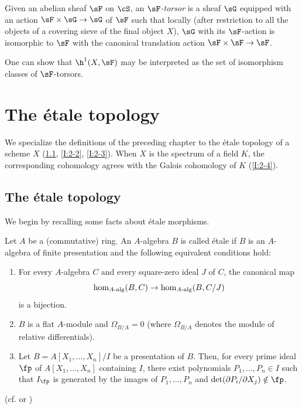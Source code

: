 \documentclass[oneside]{book}
\begin{document}
\subsubsection{}\label{I:1-6-6}

Given an abelian sheaf $\sF$ on $\cS$, an \emph{$\sF$-torsor} is a
sheaf $\sG$ equipped with an action $\sF\times\sG\to\sG$ of $\sF$
such that locally (after restriction to all the objects of a covering
sieve of the final object $X$), $\sG$ with its $\sF$-action is
isomorphic to $\sF$ with the canonical translation action
$\sF\times\sF\to\sF$.

One can show that $\h^1(X,\sF)$ may be interpreted as the set of
isomorphism classes of $\sF$-torsors.

\section{The étale topology}\label{I:2}

We specialize the definitions of the preceding chapter to the étale
topology of a scheme $X$ (\ref{I:2-1}, \ref{I:2-2}, \ref{I:2-3}). When
$X$ is the spectrum of a field $K$, the corresponding cohomology agrees
with the Galois cohomology of $K$ (\ref{I:2-4}).

\subsection{The étale topology}\label{I:2-1}

We begin by recalling some facts about étale morphisms.

\begin{definition}\label{I:2-1-1}
Let $A$ be a (commutative) ring. An $A$-algebra $B$ is called étale if
$B$ is an $A$-algebra of finite presentation and the following equivalent
conditions hold:
\begin{enumerate}[\indent a)]
  \item For every $A$-algebra $C$ and every square-zero ideal $J$ of $C$,
    the canonical map
    \[
      \hom_{A\textnormal{-alg}}(B,C) \to \hom_{A\textnormal{-alg}}(B,C/J)
    \]
    is a bijection.
  \item $B$ is a flat $A$-module and $\Omega_{B/A}=0$ (where
    $\Omega_{B/A}$ denotes the module of relative differentials).
  \item Let $B=A[X_1,\dotsc,X_n]/I$ be a presentation of $B$. Then, for
    every prime ideal $\fp$ of $A[X_1,\dotsc,X_n]$ containing $I$, there
    exist polynomials $P_1,\dotsc,P_n\in I$ such that $I_\fp$ is generated
    by the images of $P_1,\dotsc,P_n$ and
    $\det(\partial P_i/\partial X_j)\notin\fp$.
\end{enumerate}
\end{definition}
(cf. \cite[I]{sga1} or \cite[V]{ra70})
\end{document}
